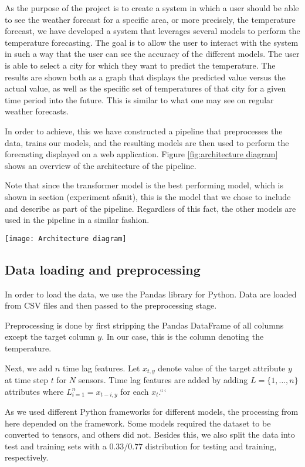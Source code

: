 As the purpose of the project is to create a system in which a user should be able to see the weather forecast for a specific area, or more precisely, the temperature forecast, we have developed a system that leverages several models to perform the temperature forecasting. 
The goal is to allow the user to interact with the system in such a way that the user can see the accuracy of the different models. 
The user is able to select a city for which they want to predict the temperature. The results are shown both as a graph that displays the predicted value versus the actual value, as well as the specific set of temperatures of that city for a given time period into the future. This is similar to what one may see on regular weather forecasts.

In order to achieve, this we have constructed a pipeline that preprocesses the data, trains our models, and the resulting models are then used to perform the forecasting displayed on a web application. 
Figure \ref{fig:architecture diagram} shows an overview of the architecture of the pipeline.

Note that since the transformer model is the best performing model, which is shown in section (experiment afsnit), this is the model that we chose to include and describe as part of the pipeline. Regardless of this fact, the other models are used in the pipeline in a similar fashion.

\begin{figure*}
	\centering
	\texttt{[image: Architecture diagram]}
	\caption{The architecture of the system pipeline.}
	\label{fig:architecture diagram}
\end{figure*}

\subsection{Data loading and preprocessing}
In order to load the data, we use the Pandas library for Python.
Data are loaded from CSV files and then passed to the preprocessing stage.

Preprocessing is done by first stripping the Pandas DataFrame of all columns except the target column $y$. In our case, this is the column denoting the temperature.

Next, we add $n$ time lag features. Let $x_{t,y}$ denote value of the target attribute $y$ at time step $t$ for $N$ sensors. 
Time lag features are added by adding $L=\{1,\dots, n\}$ attributes where $L_{i=1}^n=x_{t-i, y}$ for each $x_{t}$.```

As we used different Python frameworks for different models, the processing from here depended on the framework. Some models required the dataset to be converted to tensors, and others did not.
Besides this, we also split the data into test and training sets with a $0.33/0.77$ distribution for testing and training, respectively.